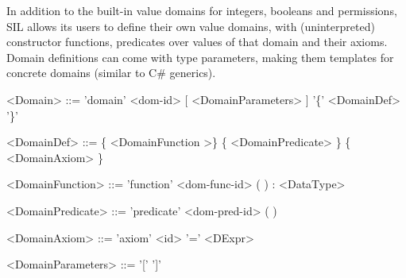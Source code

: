 In addition to the built-in value domains for integers, booleans and permissions, SIL allows its users to define their own value domains, with (uninterpreted) constructor functions, predicates over values of that domain and their axioms. Domain definitions can come with type parameters, making them templates for concrete domains (similar to C\# generics).
\begin{grammar}
<Domain> ::= 'domain' <dom-id> [ <DomainParameters> ] '\{' <DomainDef> '\}'

<DomainDef> ::= \{ <DomainFunction >\} \{ <DomainPredicate> \} \{ <DomainAxiom> \}

<DomainFunction> ::= 'function' <dom-func-id> (  ) : <DataType>

<DomainPredicate> ::= 'predicate' <dom-pred-id> (  )

<DomainAxiom> ::= 'axiom' <id> '=' <DExpr>

<DomainParameters> ::= '['  ']'
\end{grammar}
